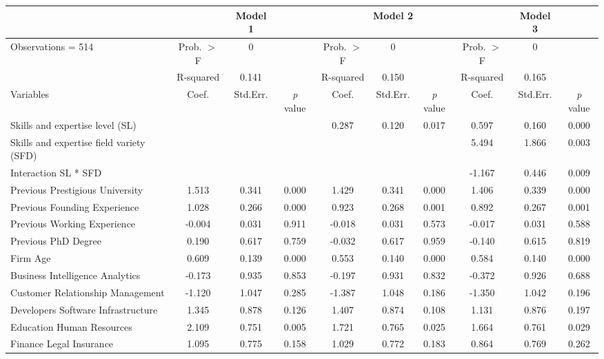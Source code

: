 \documentclass[12pt]{article}
\begin{document}
\begin{table}
\centering
\renewcommand{\arraystretch}{2}
\setlength{\tabcolsep}{2pt}
  \scriptsize
  \begin{tabular}{lccccccccc}
    \toprule
      & & \multicolumn{1}{c}{\textbf{Model 1}} & \multicolumn{5}{c}{\textbf{Model 2}} & \multicolumn{1}{c}{\textbf{Model 3}} & \\
    \hline
      Observations = 514 & Prob. $>$ F & 0 & & Prob. $>$ F & 0 & & Prob. $>$ F & 0 & \\
       & R-squared & 0.141 & & R-squared & 0.150 & & R-squared & 0.165 & \\
    \hline
      Variables & Coef. & Std.Err. & \textit{p} value & Coef. & Std.Err. & \textit{p} value & Coef. & Std.Err. & \textit{p} value \\
    \hline
      Skills and expertise level (SL) & & & & 0.287 & 0.120 & 0.017 & 0.597 & 0.160 & 0.000 \\
      Skills and expertise field variety (SFD) & & & & & & & 5.494 & 1.866 & 0.003 \\
      Interaction SL * SFD & & & & & & & -1.167 & 0.446 & 0.009 \\
      Previous Prestigious University & 1.513 & 0.341 & 0.000 & 1.429 & 0.341 & 0.000 & 1.406 & 0.339 & 0.000 \\
      Previous Founding Experience & 1.028 & 0.266 & 0.000 & 0.923 & 0.268 & 0.001 & 0.892 & 0.267 & 0.001 \\
      Previous Working Experience & -0.004 & 0.031 & 0.911 & -0.018 & 0.031 & 0.573 & -0.017 & 0.031 & 0.588 \\
      Previous PhD Degree & 0.190 & 0.617 & 0.759 & -0.032 & 0.617 & 0.959 & -0.140 & 0.615 & 0.819 \\
      Firm Age & 0.609 & 0.139 & 0.000 & 0.553 & 0.140 & 0.000 & 0.584 & 0.140 & 0.000 \\
      Business Intelligence Analytics & -0.173 & 0.935 & 0.853 & -0.197 & 0.931 & 0.832 & -0.372 & 0.926 & 0.688 \\
      Customer Relationship Management & -1.120 & 1.047 & 0.285 & -1.387 & 1.048 & 0.186 & -1.350 & 1.042 & 0.196 \\
      Developers Software Infrastructure & 1.345 & 0.878 & 0.126 & 1.407 & 0.874 & 0.108 & 1.131 & 0.876 & 0.197 \\
      Education Human Resources & 2.109 & 0.751 & 0.005 & 1.721 & 0.765 & 0.025 &  1.664 & 0.761 & 0.029 \\
      Finance Legal Insurance & 1.095 & 0.775 & 0.158 & 1.029 & 0.772 & 0.183 & 0.864 & 0.769 & 0.262 \\

\end{tabular}
\end{table}
\end{document}
